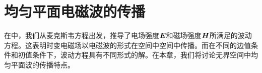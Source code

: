 \chapter{均匀平面电磁波的传播}

在中，我们从麦克斯韦方程出发，推导了电场强度$\vb*{E}$和磁场强度$\vb*{H}$所满足的波动方程。这表明时变电磁场以电磁波的形式在空间中空间中传播。而在不同的边值条件和初值条件下，波动方程具有不同形式的解。在本章，我们将讨论无界空间中均匀平面波的传播特点。



